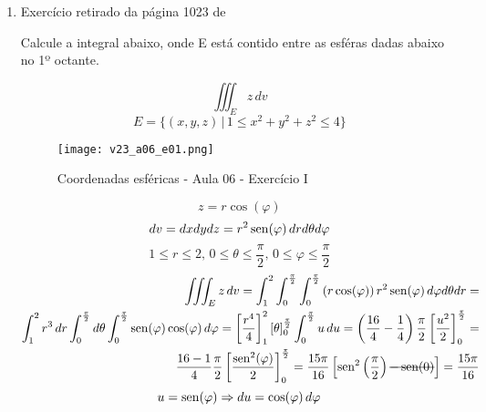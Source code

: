 \begin{enumerate}
	\item Exercício retirado da página 1023 de \cite{James_Stewart_calculo_v2}
	
	Calcule a integral abaixo, onde E está contido entre as esféras dadas abaixo no 1º octante.
	
	\begin{equation*}
		\iiint_E z\, dv
	\end{equation*}	
	\begin{equation*}
		E = \{(x,y,z) \,|\, 1 \leq x^2 + y^2 + z^2 \leq 4\}
	\end{equation*}
	
	\begin{figure}[htb]
		\caption{Coordenadas esféricas - Aula 06 - Exercício I}
		\label{v23_a06_e01}
		\centering
		\texttt{[image: v23\_a06\_e01.png]}		
	\end{figure}
	
	\begin{equation*}
		z = r\cos(\varphi)
	\end{equation*}
	\begin{equation*}
		dv = dxdydz = r^2\operatorname{sen}(\varphi)\, dr d\theta d\varphi
	\end{equation*}                                    
	\begin{equation*}
		1 \leq r \leq 2,\, 0 \leq \theta \leq \dfrac{\pi}{2},\, 0 \leq \varphi \leq \dfrac{\pi}{2}
	\end{equation*}
	\begin{align*}
		\iiint_E z\, dv = \int_1^2 \int_0^{\frac{\pi}{2}} \int_0^{\frac{\pi}{2}} \left(r\cos(\varphi)\right)r^2\sen(\varphi)\, d\varphi d\theta dr =\\ \int_1^2 r^3\, dr \int_0^{\frac{\pi}{2}} d\theta \int_0^{\frac{\pi}{2}} \sen(\varphi)\cos(\varphi)\, d\varphi = \left[\dfrac{r^4}{4}\right]_1^2 \left[\theta\right]_0^{\frac{\pi}{2}} \int_0^{\frac{\pi}{2}} u\, du = \left(\dfrac{16}{4} - \dfrac{1}{4}\right)\dfrac{\pi}{2}\left[\dfrac{u^2}{2}\right]_0^{\frac{\pi}{2}} =\\ \dfrac{16 - 1}{4}\dfrac{\pi}{2}\left[\dfrac{\sen^2(\varphi)}{2}\right]_0^{\frac{\pi}{2}} = \dfrac{15\pi}{16}\left[\sen^2\left(\dfrac{\pi}{2}\right) \overstrike{- \sen(0)}\right] = \dfrac{15\pi}{16}
	\end{align*}
	\begin{equation*}
		u = \operatorname{sen}(\varphi) \Rightarrow du = \cos(\varphi)\, d\varphi
	\end{equation*}
\end{enumerate}